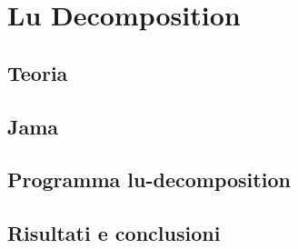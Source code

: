 \documentclass[12pt]{article}
\begin{document}
\maketitle

\section{Lu Decomposition}

\subsection{Teoria}

\subsection{Jama}

\subsection{Programma lu-decomposition}


\subsection{Risultati e conclusioni}
\end{document}
